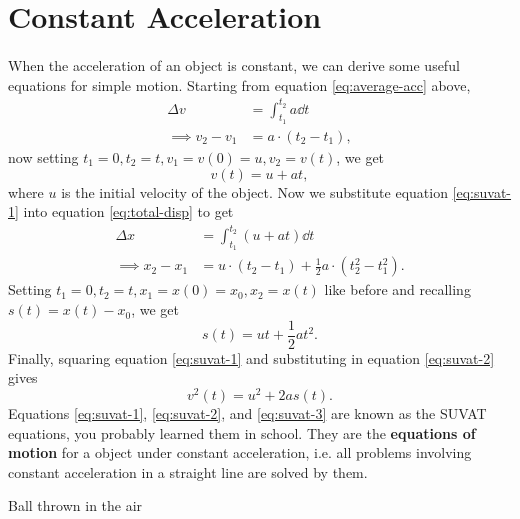 \documentclass[../classical_mechanics.tex]{subfiles}
\begin{document}
    \section{Constant Acceleration}\label{sec:suvat}
        \paragraph{}
        When the acceleration of an object is constant, we can derive some useful equations for simple motion.
        Starting from equation \ref{eq:average-acc} above,
        \begin{align*}
            \Delta v&=\int_{t_1}^{t_2}a\dd{t}\\
            \implies v_2-v_1&=a\cdot(t_2-t_1),
        \end{align*}
        now setting $t_1=0,t_2=t,v_1=v(0)=u,v_2=v(t)$, we get
        \begin{equation}\label{eq:suvat-1}
            v(t)=u+at,
        \end{equation}
        where $u$ is the initial velocity of the object.
        Now we substitute equation \ref{eq:suvat-1} into equation \ref{eq:total-disp} to get
        \begin{align*}
            \Delta x&=\int_{t_1}^{t_2}(u+at)\dd{t}\\
            \implies x_2-x_1&=u\cdot(t_2-t_1)+\frac{1}{2}a\cdot(t_2^2-t_1^2).
        \end{align*}
        Setting $t_1=0,t_2=t,x_1=x(0)=x_0,x_2=x(t)$ like before and recalling $s(t)=x(t)-x_0$, we get
        \begin{equation}\label{eq:suvat-2}
            s(t)=ut+\frac{1}{2}at^2.
        \end{equation}
        Finally, squaring equation \ref{eq:suvat-1} and substituting in equation \ref{eq:suvat-2} gives
        \begin{equation}\label{eq:suvat-3}
            v^2(t)=u^2+2as(t).
        \end{equation}
        Equations \ref{eq:suvat-1}, \ref{eq:suvat-2}, and \ref{eq:suvat-3} are known as the SUVAT equations, you probably learned them in school.
        They are the \textbf{equations of motion} for a object under constant acceleration, i.e. all problems involving constant acceleration in a straight line are solved by them.
        \begin{example}
            Ball thrown in the air %
        \end{example}
\end{document}
